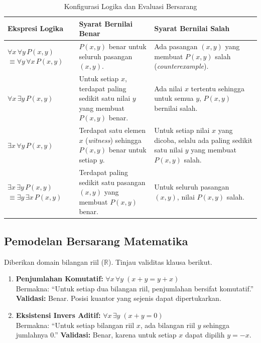 \begin{table}[H]
\centering
\renewcommand{\arraystretch}{1.5}
\begin{tabular}{|p{3cm}|p{5.5cm}|p{5.5cm}|}
\hline
\textbf{Ekspresi Logika} & \textbf{Syarat Bernilai Benar} & \textbf{Syarat Bernilai Salah} \\ \hline

$\forall x \, \forall y \, P(x,y)$ 
\newline $\equiv \forall y \, \forall x \, P(x,y)$ & 
$P(x,y)$ benar untuk seluruh pasangan $(x,y)$. & 
Ada pasangan $(x,y)$ yang membuat $P(x,y)$ salah (\textit{counterexample}). \\ \hline

$\forall x \, \exists y \, P(x,y)$ & 
Untuk setiap $x$, terdapat paling sedikit satu nilai $y$ yang membuat $P(x,y)$ benar. & 
Ada nilai $x$ tertentu sehingga untuk semua $y$, $P(x,y)$ bernilai salah. \\ \hline

$\exists x \, \forall y \, P(x,y)$ & 
Terdapat satu elemen $x$ (\textit{witness}) sehingga $P(x,y)$ benar untuk setiap $y$. & 
Untuk setiap nilai $x$ yang dicoba, selalu ada paling sedikit satu nilai $y$ yang membuat $P(x,y)$ salah. \\ \hline

$\exists x \, \exists y \, P(x,y)$
\newline $\equiv \exists y \, \exists x \, P(x,y)$ & 
Terdapat paling sedikit satu pasangan $(x,y)$ yang membuat $P(x,y)$ benar. & 
Untuk seluruh pasangan $(x,y)$, nilai $P(x,y)$ salah. \\ \hline

\end{tabular}
\caption{Konfigurasi Logika dan Evaluasi Bersarang}
\end{table}

\subsection{Pemodelan Bersarang Matematika}

\begin{contoh}
Diberikan domain bilangan riil ($\mathbb{R}$). Tinjau validitas klausa berikut.
\begin{enumerate}
    \item \textbf{Penjumlahan Komutatif:} \quad $\forall x \, \forall y \; (x + y = y + x)$ \\
    Bermakna: ``Untuk setiap dua bilangan riil, penjumlahan bersifat komutatif.''
    \textbf{Validasi:} Benar. Posisi kuantor yang sejenis dapat dipertukarkan.
    
    \item \textbf{Eksistensi Invers Aditif:} \quad $\forall x \, \exists y \; (x + y = 0)$ \\
    Bermakna: ``Untuk setiap bilangan riil $x$, ada bilangan riil $y$ sehingga jumlahnya 0.''
    \textbf{Validasi:} Benar, karena untuk setiap $x$ dapat dipilih $y=-x$.
\end{enumerate}
\end{contoh}
